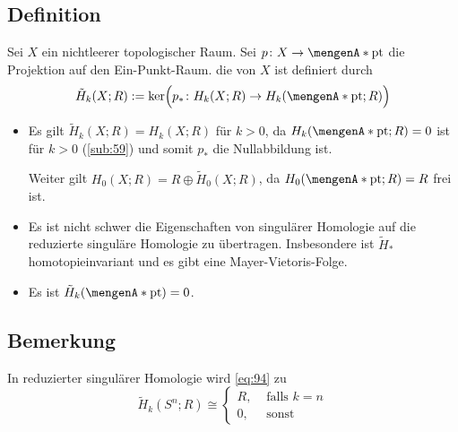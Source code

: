 \subsection[Definition: Reduzierte Homologie]{Definition} %
\label{sub:95}
Sei $X$ ein nichtleerer topologischer Raum. Sei $p \colon X  \to \set{\mathrm{pt}}$ die Projektion auf den Ein-Punkt-Raum. die  von $X$ ist definiert
durch 
\[
	\tilde{H}_k(X;R) := \ker \enbrace[\Big]{ p_* \colon H_k(X;R) \to H_k(\set{\mathrm{pt}};R )} 
\]
\begin{itemize}
	\item Es gilt $\tilde{H}_k(X;R) =H_k(X;R)$ für $k>0$, da $H_k \enbrace*{\set{\mathrm{pt}};R }=0$ ist für $k>0$ (\ref{sub:59}) und somit $p_*$ die Nullabbildung ist.
	
	Weiter gilt $H_0(X;R) = R \oplus \tilde{H}_0(X;R)$, da $H_0(\set{\mathrm{pt}};R)=R$ frei ist.
	\item Es ist nicht schwer die Eigenschaften von singulärer Homologie auf die reduzierte singuläre Homologie zu übertragen. Insbesondere ist $\tilde{H}_*$ 
	homotopieinvariant und es gibt eine Mayer-Vietoris-Folge.
	\item Es ist $\tilde{H}_k \enbrace*{\set{\mathrm{pt}}}=0$.
\end{itemize}

\subsection[Bemerkung: Die Aussage von Satz \ref{sub:94} in reduzierter Homologie]{Bemerkung} %
\label{sub:96}
In reduzierter singulärer Homologie wird \eqref{eq:94} zu
\begin{equation*}
	\tilde{H}_k(S^n;R) \cong \begin{cases}
		R, &\text{ falls }k=n\\
		0 , &\text{ sonst}
	\end{cases} \label{eq:96}\tag{\#\#}
\end{equation*}

